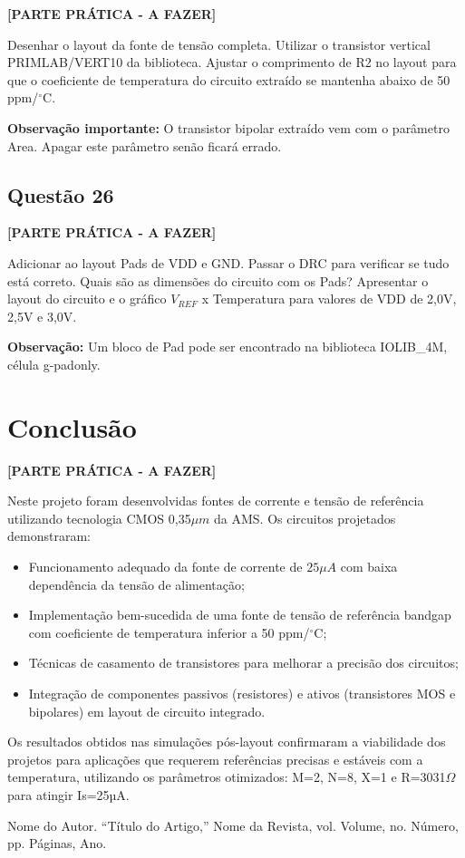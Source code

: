 \documentclass[12pt,a4paper]{article}
\newcommand{\degree}{\ensuremath{{}^\circ}}
\begin{document}
\textbf{[PARTE PRÁTICA - A FAZER]}

Desenhar o layout da fonte de tensão completa. Utilizar o transistor vertical PRIMLAB/VERT10 da biblioteca. Ajustar o comprimento de R2 no layout para que o coeficiente de temperatura do circuito extraído se mantenha abaixo de 50 ppm/$\degree$C.

\textbf{Observação importante:} O transistor bipolar extraído vem com o parâmetro Area. Apagar este parâmetro senão ficará errado.

\subsection*{Questão 26}

\textbf{[PARTE PRÁTICA - A FAZER]}

Adicionar ao layout Pads de VDD e GND. Passar o DRC para verificar se tudo está correto. Quais são as dimensões do circuito com os Pads? Apresentar o layout do circuito e o gráfico $V_{REF}$ x Temperatura para valores de VDD de 2,0V, 2,5V e 3,0V.

\textbf{Observação:} Um bloco de Pad pode ser encontrado na biblioteca IOLIB\_4M, célula g-padonly.

\section*{Conclusão}

\textbf{[PARTE PRÁTICA - A FAZER]}

Neste projeto foram desenvolvidas fontes de corrente e tensão de referência utilizando tecnologia CMOS 0,35$\mu m$ da AMS. Os circuitos projetados demonstraram:

\begin{itemize}
    \item Funcionamento adequado da fonte de corrente de $25\mu A$ com baixa dependência da tensão de alimentação;
    \item Implementação bem-sucedida de uma fonte de tensão de referência bandgap com coeficiente de temperatura inferior a 50 ppm/$\degree$C;
    \item Técnicas de casamento de transistores para melhorar a precisão dos circuitos;
    \item Integração de componentes passivos (resistores) e ativos (transistores MOS e bipolares) em layout de circuito integrado.
\end{itemize}

Os resultados obtidos nas simulações pós-layout confirmaram a viabilidade dos projetos para aplicações que requerem referências precisas e estáveis com a temperatura, utilizando os parâmetros otimizados: M=2, N=8, X=1 e R=3031$\Omega$ para atingir Is=25µA.

{}
\begin{thebibliography}{99}
     Nome do Autor. ``Título do Artigo,'' Nome da Revista, vol. Volume, no. Número, pp. Páginas, Ano.
\end{thebibliography}
\end{document}
